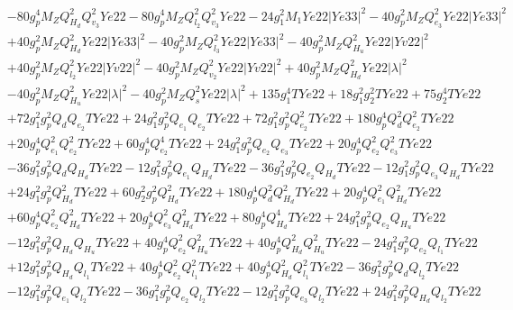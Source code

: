 \begin{align}
 &-80 g_{p}^{4} M_Z Q_{H_d}^{2} Q_{v_3}^{2} Ye22 -80 g_{p}^{4} M_Z Q_{l_2}^{2} Q_{v_3}^{2} Ye22 -24 g_{1}^{2} M_1 Ye22 |Ye33|^2 -40 g_{p}^{2} M_Z Q_{e_3}^{2} Ye22 |Ye33|^2 \nonumber \\ 
 &+40 g_{p}^{2} M_Z Q_{H_d}^{2} Ye22 |Ye33|^2 -40 g_{p}^{2} M_Z Q_{l_3}^{2} Ye22 |Ye33|^2 -40 g_{p}^{2} M_Z Q_{H_u}^{2} Ye22 |Yv22|^2 \nonumber \\ 
 &+40 g_{p}^{2} M_Z Q_{l_2}^{2} Ye22 |Yv22|^2 -40 g_{p}^{2} M_Z Q_{v_2}^{2} Ye22 |Yv22|^2 +40 g_{p}^{2} M_Z Q_{H_d}^{2} Ye22 |\lambda|^2 \nonumber \\ 
 &-40 g_{p}^{2} M_Z Q_{H_u}^{2} Ye22 |\lambda|^2 -40 g_{p}^{2} M_Z Q_{s}^{2} Ye22 |\lambda|^2 +135 g_{1}^{4} TYe22 +18 g_{1}^{2} g_{2}^{2} TYe22 +75 g_{2}^{4} TYe22 \nonumber \\ 
 &+72 g_{1}^{2} g_{p}^{2} Q_{d} Q_{e_{2}} TYe22 +24 g_{1}^{2} g_{p}^{2} Q_{e_{1}} Q_{e_{2}} TYe22 +72 g_{1}^{2} g_{p}^{2} Q_{e_{2}}^{2} TYe22 +180 g_{p}^{4} Q_{d}^{2} Q_{e_{2}}^{2} TYe22 \nonumber \\ 
 &+20 g_{p}^{4} Q_{e_{1}}^{2} Q_{e_{2}}^{2} TYe22 +60 g_{p}^{4} Q_{e_{2}}^{4} TYe22 +24 g_{1}^{2} g_{p}^{2} Q_{e_{2}} Q_{e_3} TYe22 +20 g_{p}^{4} Q_{e_{2}}^{2} Q_{e_3}^{2} TYe22 \nonumber \\ 
 &-36 g_{1}^{2} g_{p}^{2} Q_{d} Q_{H_d} TYe22 -12 g_{1}^{2} g_{p}^{2} Q_{e_{1}} Q_{H_d} TYe22 -36 g_{1}^{2} g_{p}^{2} Q_{e_{2}} Q_{H_d} TYe22 -12 g_{1}^{2} g_{p}^{2} Q_{e_3} Q_{H_d} TYe22 \nonumber \\ 
 &+24 g_{1}^{2} g_{p}^{2} Q_{H_d}^{2} TYe22 +60 g_{2}^{2} g_{p}^{2} Q_{H_d}^{2} TYe22 +180 g_{p}^{4} Q_{d}^{2} Q_{H_d}^{2} TYe22 +20 g_{p}^{4} Q_{e_{1}}^{2} Q_{H_d}^{2} TYe22 \nonumber \\ 
 &+60 g_{p}^{4} Q_{e_{2}}^{2} Q_{H_d}^{2} TYe22 +20 g_{p}^{4} Q_{e_3}^{2} Q_{H_d}^{2} TYe22 +80 g_{p}^{4} Q_{H_d}^{4} TYe22 +24 g_{1}^{2} g_{p}^{2} Q_{e_{2}} Q_{H_u} TYe22 \nonumber \\ 
 &-12 g_{1}^{2} g_{p}^{2} Q_{H_d} Q_{H_u} TYe22 +40 g_{p}^{4} Q_{e_{2}}^{2} Q_{H_u}^{2} TYe22 +40 g_{p}^{4} Q_{H_d}^{2} Q_{H_u}^{2} TYe22 -24 g_{1}^{2} g_{p}^{2} Q_{e_{2}} Q_{l_1} TYe22 \nonumber \\ 
 &+12 g_{1}^{2} g_{p}^{2} Q_{H_d} Q_{l_1} TYe22 +40 g_{p}^{4} Q_{e_{2}}^{2} Q_{l_1}^{2} TYe22 +40 g_{p}^{4} Q_{H_d}^{2} Q_{l_1}^{2} TYe22 -36 g_{1}^{2} g_{p}^{2} Q_{d} Q_{l_2} TYe22 \nonumber \\ 
 &-12 g_{1}^{2} g_{p}^{2} Q_{e_{1}} Q_{l_2} TYe22 -36 g_{1}^{2} g_{p}^{2} Q_{e_{2}} Q_{l_2} TYe22 -12 g_{1}^{2} g_{p}^{2} Q_{e_3} Q_{l_2} TYe22 +24 g_{1}^{2} g_{p}^{2} Q_{H_d} Q_{l_2} TYe22 \nonumber \\ 

\end{align}
